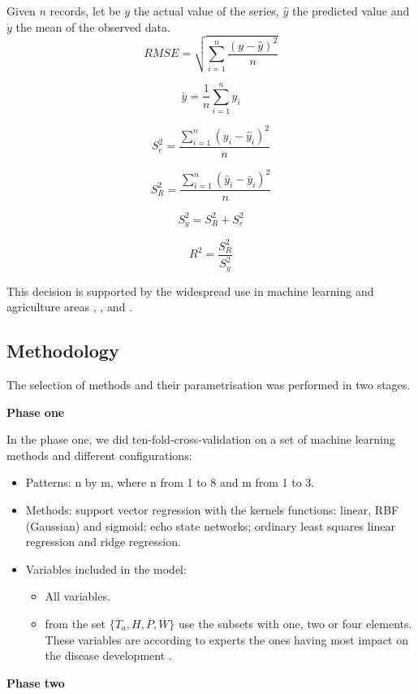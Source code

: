 \documentclass[review]{elsarticle}
\begin{document}
Given $n$ records, let be $y$ the actual value of the series, $\hat{y}$ the predicted value and $\acute{y}$ the mean of the observed data.
$$RMSE = \sqrt{ \sum_{i=1}^{n} \frac{{(y-\hat{y})}^2}{n} }$$

$$ \bar{y} = \frac{1}{n} \sum_{i=1}^{n} y_i $$

$$ S_e^2 = \frac{\sum_{i=1}^{n} {(y_i-\hat{y}_i)}^2 }{n}$$

$$ S_R^2 = \frac{\sum_{i=1}^{n} {(\hat{y}_i-\bar{y}_i)}^2 }{n}$$

$$ S_y^2 = S_R^2 + S_e^2$$

$$ R^2 = \frac{S_R^2}{S_y^2}$$
	
This decision is supported by the widespread use in machine learning and agriculture areas \citep{Soares2014}, \citep{Soares2013}, \citep{Ibrahim2014} and \citep{Demir2014}.  

\subsection{Methodology}
The selection of methods and their parametrisation was performed in two stages.

{\bf Phase one } 

In the phase one, we did ten-fold-cross-validation on a set of  machine learning methods and different configurations:

\begin{itemize}
\item 	Patterns: n by m, where n from 1 to 8 and m from 1 to 3.

\item Methods: support vector regression with the kernels functions: linear, RBF (Gaussian) and sigmoid; echo state networks; ordinary least squares linear regression and ridge regression.

\item Variables included in the model:
\begin{itemize}
\item All variables.
\item from the set $\{ \overline{T}_{a} , H, \overline{P} , \overline{W}  \}$ use the subsets with one, two or four elements. These variables are according to experts the ones having most impact on the disease development \citep{MarinVargas1995}.
\end{itemize}

\end{itemize}

{\bf Phase two }
\end{document}
